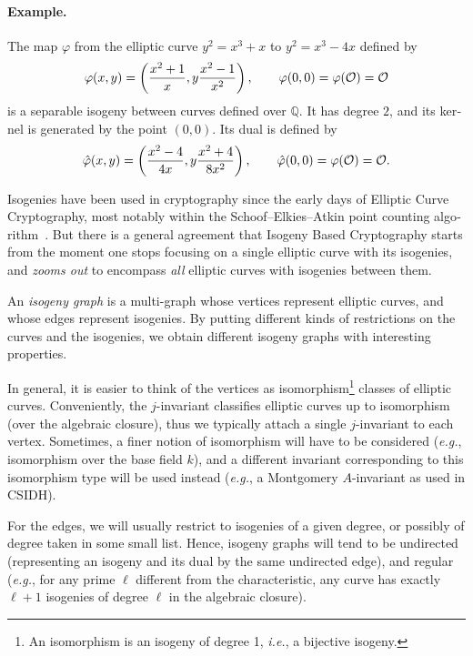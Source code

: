 \begin{otherlanguage}{english}
  \paragraph{Example.}
  The map $\varphi$ from the elliptic curve $y^2=x^3+x$ to $y^2=x^3-4x$
  defined by
  \begin{equation*}
      \varphi(x,y) = \left(\frac{x^2+1}{x},y\frac{x^2-1}{x^2}\right),\qquad
      \varphi(0,0) = \varphi(\mathcal{O}) = \mathcal{O}
  \end{equation*}
  is a separable isogeny between curves defined over $\mathbb{Q}$. %
  It has degree $2$, and its kernel is generated by the point
  $(0,0)$. %
  Its dual is defined by
  \begin{equation*}
      \hat\varphi(x,y) = \left(\frac{x^2-4}{4x},y\frac{x^2+4}{8x^2}\right),\qquad
      \hat\varphi(0,0) = \varphi(\mathcal{O}) = \mathcal{O}.
  \end{equation*}

  Isogenies have been used in cryptography since the early days of
  Elliptic Curve Cryptography, most notably within the
  Schoof--Elkies--Atkin point counting algorithm~\cite{schoof95}.  But
  there is a general agreement that Isogeny Based Cryptography starts
  from the moment one stops focusing on a single elliptic curve with
  its isogenies, and \emph{zooms out} to encompass \emph{all} elliptic
  curves with isogenies between them.

  An \emph{isogeny graph} is a multi-graph whose vertices represent
  elliptic curves, and whose edges represent isogenies. By putting
  different kinds of restrictions on the curves and the isogenies, we
  obtain different isogeny graphs with interesting properties.

  In general, it is easier to think of the vertices as
  isomorphism\footnote{An isomorphism is an isogeny of degree 1,
    \emph{i.e.}, a bijective isogeny.} classes of elliptic
  curves. Conveniently, the $j$-invariant classifies elliptic curves
  up to isomorphism (over the algebraic closure), thus we typically
  attach a single $j$-invariant to each vertex. Sometimes, a finer
  notion of isomorphism will have to be considered (\emph{e.g.},
  isomorphism over the base field $k$), and a different invariant
  corresponding to this isomorphism type will be used instead
  (\emph{e.g.}, a Montgomery $A$-invariant as used in CSIDH).
  
  For the edges, we will usually restrict to isogenies of a given
  degree, or possibly of degree taken in some small list. Hence,
  isogeny graphs will tend to be undirected (representing an isogeny
  and its dual by the same undirected edge), and regular (\emph{e.g.},
  for any prime $\ell$ different from the characteristic, any curve
  has exactly $\ell+1$ isogenies of degree $\ell$ in the algebraic
  closure).


\end{otherlanguage}
